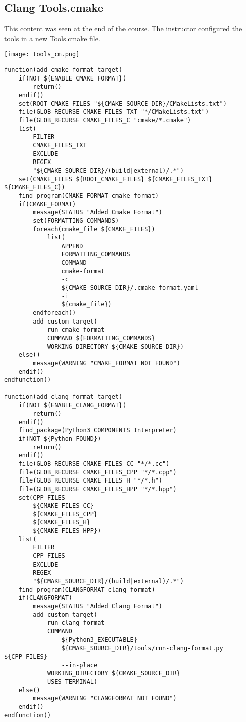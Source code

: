 \subsection{Clang Tools.cmake}

This content was seen at the end of the course. The instructor configured the tools in a new Tools.cmake file.


\begin{center}
    \texttt{[image: tools\_cm.png]}
\end{center}


\begin{verbatim}
function(add_cmake_format_target)
    if(NOT ${ENABLE_CMAKE_FORMAT})
        return()
    endif()
    set(ROOT_CMAKE_FILES "${CMAKE_SOURCE_DIR}/CMakeLists.txt")
    file(GLOB_RECURSE CMAKE_FILES_TXT "*/CMakeLists.txt")
    file(GLOB_RECURSE CMAKE_FILES_C "cmake/*.cmake")
    list(
        FILTER
        CMAKE_FILES_TXT
        EXCLUDE
        REGEX
        "${CMAKE_SOURCE_DIR}/(build|external)/.*")
    set(CMAKE_FILES ${ROOT_CMAKE_FILES} ${CMAKE_FILES_TXT} ${CMAKE_FILES_C})
    find_program(CMAKE_FORMAT cmake-format)
    if(CMAKE_FORMAT)
        message(STATUS "Added Cmake Format")
        set(FORMATTING_COMMANDS)
        foreach(cmake_file ${CMAKE_FILES})
            list(
                APPEND
                FORMATTING_COMMANDS
                COMMAND
                cmake-format
                -c
                ${CMAKE_SOURCE_DIR}/.cmake-format.yaml
                -i
                ${cmake_file})
        endforeach()
        add_custom_target(
            run_cmake_format
            COMMAND ${FORMATTING_COMMANDS}
            WORKING_DIRECTORY ${CMAKE_SOURCE_DIR})
    else()
        message(WARNING "CMAKE_FORMAT NOT FOUND")
    endif()
endfunction()

function(add_clang_format_target)
    if(NOT ${ENABLE_CLANG_FORMAT})
        return()
    endif()
    find_package(Python3 COMPONENTS Interpreter)
    if(NOT ${Python_FOUND})
        return()
    endif()
    file(GLOB_RECURSE CMAKE_FILES_CC "*/*.cc")
    file(GLOB_RECURSE CMAKE_FILES_CPP "*/*.cpp")
    file(GLOB_RECURSE CMAKE_FILES_H "*/*.h")
    file(GLOB_RECURSE CMAKE_FILES_HPP "*/*.hpp")
    set(CPP_FILES
        ${CMAKE_FILES_CC}
        ${CMAKE_FILES_CPP}
        ${CMAKE_FILES_H}
        ${CMAKE_FILES_HPP})
    list(
        FILTER
        CPP_FILES
        EXCLUDE
        REGEX
        "${CMAKE_SOURCE_DIR}/(build|external)/.*")
    find_program(CLANGFORMAT clang-format)
    if(CLANGFORMAT)
        message(STATUS "Added Clang Format")
        add_custom_target(
            run_clang_format
            COMMAND
                ${Python3_EXECUTABLE}
                ${CMAKE_SOURCE_DIR}/tools/run-clang-format.py ${CPP_FILES}
                --in-place
            WORKING_DIRECTORY ${CMAKE_SOURCE_DIR}
            USES_TERMINAL)
    else()
        message(WARNING "CLANGFORMAT NOT FOUND")
    endif()
endfunction()


\end{verbatim}
